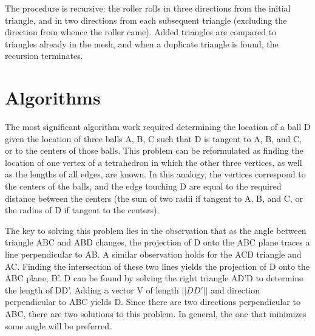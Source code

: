 \documentclass[letterpaper,10pt]{IEEEtran}
\begin{document}
The procedure is recursive: the roller rolls in three directions from the initial triangle, and in two directions from each subsequent triangle (excluding the direction from whence the roller came).
Added triangles are compared to triangles already in the mesh, and when a duplicate triangle is found, the recursion terminates.

\section{Algorithms}
The most significant algorithm work required determining the location of a ball D given the location of three balls A, B, C such that D is tangent to A, B, and C, or to the centers of those balls.
This problem can be reformulated as finding the location of one vertex of a tetrahedron in which the other three vertices, as well as the lengths of all edges, are known.
In this analogy, the vertices correspond to the centers of the balls, and the edge touching D are equal to the required distance between the centers (the sum of two radii if tangent to A, B, and C, or the radius of D if tangent to the centers).

The key to solving this problem lies in the observation that as the angle between triangle ABC and ABD changes, the projection of D onto the ABC plane traces a line perpendicular to AB.
A similar observation holds for the ACD triangle and AC.
Finding the intersection of these two lines yields the projection of D onto the ABC plane, D'.
D can be found by solving the right triangle AD'D to determine the length of DD'.
Adding a vector V of length $||DD'||$ and direction perpendicular to ABC yields D.
Since there are two directions perpendicular to ABC, there are two solutions to this problem.
In general, the one that minimizes some angle will be preferred.


%
\end{document}
